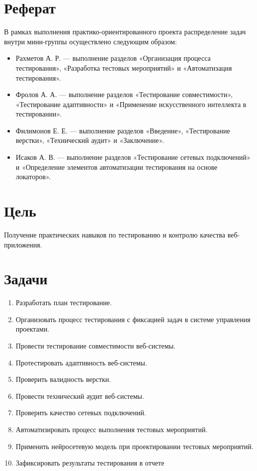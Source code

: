 \section*{Реферат}

В рамках выполнения практико-ориентированного проекта распределение задач внутри мини-группы осуществлено следующим образом:
\begin{itemize}
    \item Рахметов А. Р. — выполнение разделов «Организация процесса тестирования», «Разработка тестовых мероприятий» и «Автоматизация тестирования».
    \item Фролов А. А. — выполнение разделов «Тестирование совместимости», «Тестирование адаптивности» и «Применение искусственного интеллекта в тестировании».
    \item Филимонов Е. Е. — выполнение разделов «Введение», «Тестирование верстки», «Технический аудит» и «Заключение».
    \item Исаков А. В. — выполнение разделов «Тестирование сетевых подключений» и «Определение элементов автоматизации тестирования на основе локаторов».
\end{itemize}

\section*{Цель}
Получение практических навыков по тестированию и контролю качества веб-приложения.

\section*{Задачи}
\begin{enumerate}
    \item Разработать план тестирование.
    \item Организовать процесс тестирования с фиксацией задач в системе управления проектами.
    \item Провести тестирование совместимости веб-системы.
    \item Протестировать адаптивность веб-системы.
    \item Проверить валидность верстки.
    \item Провести технический аудит веб-системы.
    \item Проверить качество сетевых подключений.
    \item Автоматизировать процесс выполнения тестовых мероприятий.
    \item Применить нейросетевую модель при проектировании тестовых мероприятий.
    \item Зафиксировать результаты тестирования в отчете
\end{enumerate}

